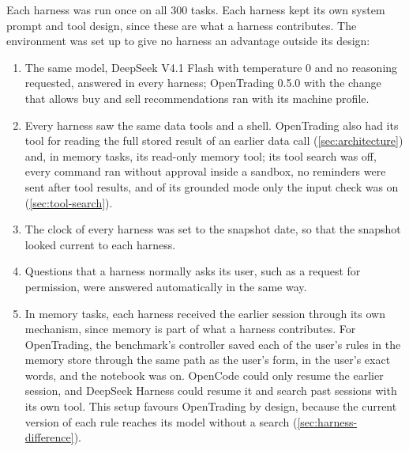 \label{sec:bench-design}
Each harness was run once on all 300 tasks.
Each harness kept its own system prompt and tool design, since these are what a harness contributes.
The environment was set up to give no harness an advantage outside its design:
\begin{enumerate}
  \item The same model, DeepSeek V4.1 Flash with temperature 0 and no reasoning requested, answered in every harness; OpenTrading 0.5.0 with the change that allows buy and sell recommendations ran with its machine profile.
  \item Every harness saw the same data tools and a shell. OpenTrading also had its tool for reading the full stored result of an earlier data call (\cref{sec:architecture}) and, in memory tasks, its read-only memory tool; its tool search was off, every command ran without approval inside a sandbox, no reminders were sent after tool results, and of its grounded mode only the input check was on (\cref{sec:tool-search}).
  \item The clock of every harness was set to the snapshot date, so that the snapshot looked current to each harness.
  \item Questions that a harness normally asks its user, such as a request for permission, were answered automatically in the same way.
  \item In memory tasks, each harness received the earlier session through its own mechanism, since memory is part of what a harness contributes.
  For OpenTrading, the benchmark's controller saved each of the user's rules in the memory store through the same path as the user's form, in the user's exact words, and the notebook was on.
  OpenCode could only resume the earlier session, and DeepSeek Harness could resume it and search past sessions with its own tool.
  This setup favours OpenTrading by design, because the current version of each rule reaches its model without a search (\cref{sec:harness-difference}).
\end{enumerate}


